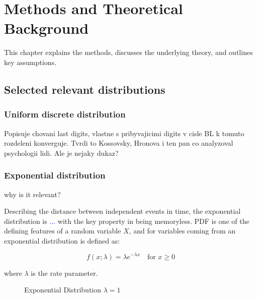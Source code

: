 \chapter{Methods and Theoretical Background}

This chapter explains the methods, discusses the underlying theory, and outlines key assumptions. 

\section{Selected relevant distributions}

\subsection{Uniform discrete distribution}

\begin{koment}
    Popisuje chovani last digits, vlastne s pribyvajicimi digits v cisle BL k tomuto rozdeleni konverguje. Tvrdi to Kossovsky, Hronova i ten pan co analyzoval psychologii lidi. Ale je nejaky dukaz? 
\end{koment}


\subsection{Exponential distribution}

\begin{koment}
    why is it relevant? 
\end{koment}

Describing the distance between independent events in time, the exponential distribution is \textcolor{blue}{...} with the key property in being memoryless. PDF is one of the defining features of a random variable $X$, and for variables coming from an exponential distribution is defined as: 

\begin{equation}
    f(x;\lambda) = \lambda e^{-\lambda x} \quad \text{for } x \ge 0 
\end{equation}

where $\lambda$ is the rate parameter. \cite{Marek2024}

\begin{figure}[h]
    \centering
    \caption{Exponential Distribution $\lambda = 1$}
    \label{fig:Exp1}
\end{figure}

